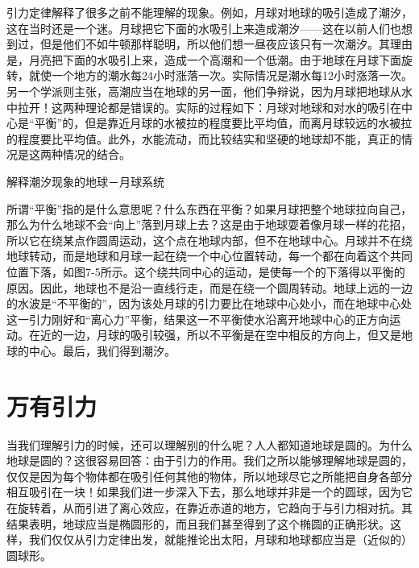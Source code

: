 \documentclass[12pt,oneside]{book}
\begin{document}
\begin{common-format}
引力定律解释了很多之前不能理解的现象。例如，月球对地球的吸引造成了潮汐，这在当时还是一个迷。月球把它下面的水吸引上来造成潮汐——这在以前人们也想到过，但是他们不如牛顿那样聪明，所以他们想一昼夜应该只有一次潮汐。其理由是，月亮把下面的水吸引上来，造成一个高潮和一个低潮。由于地球在月球下面旋转，就使一个地方的潮水每24小时涨落一次。实际情况是潮水每12小时涨落一次。另一个学派则主张，高潮应当在地球的另一面，他们争辩说，因为月球把地球从水中拉开！这两种理论都是错误的。实际的过程如下：月球对地球和对水的吸引在中心是“平衡”的，但是靠近月球的水被拉的程度要比平均值，而离月球较远的水被拉的程度要比平均值。此外，水能流动，而比较结实和坚硬的地球却不能，真正的情况是这两种情况的结合。
\begin{fig}{解释潮汐现象的地球－月球系统}
\caption{解释潮汐现象的地球－月球系统}
\label{fig:解释潮汐现象的地球－月球系统}
\end{fig}

所谓“平衡”指的是什么意思呢？什么东西在平衡？如果月球把整个地球拉向自己，那么为什么地球不会“向上”落到月球上去？这是由于地球耍着像月球一样的花招，所以它在绕某点作圆周运动，这个点在地球内部，但不在地球中心。月球并不在绕地球转动，而是地球和月球一起在绕一个中心位置转动，每一个都在向着这个共同位置下落，如图7-5所示。这个绕共同中心的运动，是使每一个的下落得以平衡的原因。因此，地球也不是沿一直线行走，而是在绕一个圆周转动。地球上远的一边的水波是“不平衡的”，因为该处月球的引力要比在地球中心处小，而在地球中心处这一引力刚好和“离心力”平衡，结果这一不平衡使水沿离开地球中心的正方向运动。在近的一边，月球的吸引较强，所以不平衡是在空中相反的方向上，但又是地球的中心。最后，我们得到潮汐。



\section{万有引力}
当我们理解引力的时候，还可以理解别的什么呢？人人都知道地球是圆的。为什么地球是圆的？这很容易回答：由于引力的作用。我们之所以能够理解地球是圆的，仅仅是因为每个物体都在吸引任何其他的物体，所以地球尽它之所能把自身各部分相互吸引在一块！如果我们进一步深入下去，那么地球并非是一个的圆球，因为它在旋转着，从而引进了离心效应，在靠近赤道的地方，它趋向于与引力相对抗。其结果表明，地球应当是椭圆形的，而且我们甚至得到了这个椭圆的正确形状。这样，我们仅仅从引力定律出发，就能推论出太阳，月球和地球都应当是（近似的）圆球形。


\end{common-format}
\end{document}
